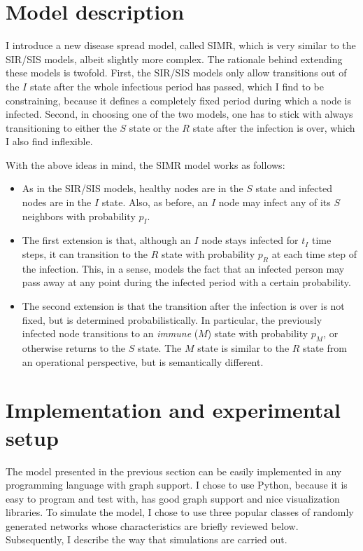 \documentclass[11pt]{article} %
\begin{document}
\section{Model description}
I introduce a new disease spread model, called SIMR, which is very similar to
the SIR/SIS models, albeit slightly more complex. The rationale behind extending
these models is twofold. First, the SIR/SIS models only allow transitions out
of the $I$ state after the whole infectious period has passed, which I find to be
constraining, because it defines a completely fixed period during which a node is
infected. Second, in choosing one of the two models, one has to stick with
always transitioning to either the $S$ state or the $R$ state after the infection
is over, which I also find inflexible.

With the above ideas in mind, the SIMR model works as follows:
\begin{itemize}
\item As in the SIR/SIS models, healthy nodes are in the $S$ state and infected
nodes are in the $I$ state. Also, as before, an $I$ node may infect any of its
$S$ neighbors with probability $p_I$.
\item The first extension is that, although an $I$ node stays infected for $t_I$
time steps, it can transition to the $R$ state with probability $p_R$ at each
time step of the infection. This, in a sense, models the fact that an infected
person may pass away at any point during the infected period with a certain
probability.
\item The second extension is that the transition after the infection is over
is not fixed, but is determined probabilistically. In particular, the previously
infected node transitions to an \emph{immune} ($M$) state with probability $p_M$,
or otherwise returns to the $S$ state. The $M$ state is similar to the $R$
state from an operational perspective, but is semantically different.
\end{itemize}

\section{Implementation and experimental setup}
The model presented in the previous section can be easily implemented in any
programming language with graph support. I chose to use Python, because it is
easy to program and test with, has good graph support and nice visualization
libraries.
To simulate the model, I chose to use three popular classes of randomly generated
networks whose characteristics are briefly reviewed below. Subsequently, I
describe the way that simulations are carried out.
\end{document}
